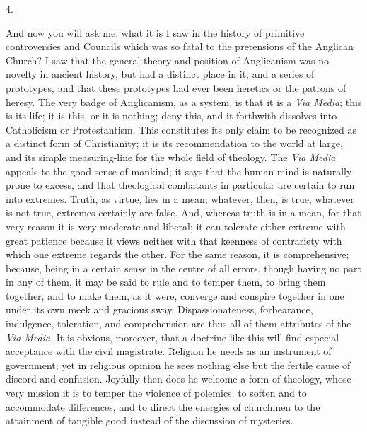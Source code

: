 4.

And now you will ask me, what it is I saw in the history of
primitive controversies and Councils which was so fatal to the
pretensions of the Anglican Church? I saw that the general theory and
position of Anglicanism was no novelty in ancient history, but had a
distinct place in it, and a series of prototypes, and that these
prototypes had ever been heretics or the patrons of heresy. The very
badge of Anglicanism, as a system, is that it is a \emph{Via Media};
this is its life; it is this, or it is nothing; deny this, and it
forthwith dissolves into Catholicism or Protestantism. This
constitutes its only claim to be recognized as a distinct form of
Christianity; it is its recommendation to the world at large, and its
simple measuring-line for the whole field of theology. The \emph{Via
Media} appeals to the good sense of mankind; it says that the human
mind is naturally prone to excess, and that theological combatants in
particular are certain to run into extremes. Truth, as virtue, lies in
a mean; whatever, then, is true, whatever is not true, extremes
certainly are false. And, whereas truth is in a mean, for that very
reason it is very moderate and liberal; it can tolerate either extreme
with great patience because it views neither with that keenness of
contrariety with which one extreme regards the other. For the same
reason, it is comprehensive; because, being in a certain sense in the
centre of all errors, though having no part in any of them, it may be
said to rule and to temper them, to bring them together, and to make
them, as it were, converge and conspire together in one under its own
meek and gracious sway. Dispassionateness, forbearance, indulgence,
toleration, and comprehension are thus all of them attributes of the \emph{Via
Media}. It is obvious, moreover, that a doctrine like this will
find especial acceptance with the civil magistrate. Religion he needs
as an instrument of government; yet in religious opinion he sees
nothing else but the fertile cause of discord and confusion. Joyfully
then does he welcome a form of theology, whose very mission it is to
temper the violence of polemics, to soften and to accommodate
differences, and to direct the energies of churchmen to the attainment
of tangible good instead of the discussion of mysteries.

